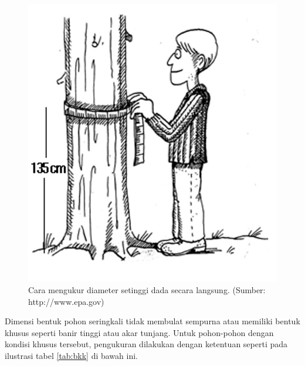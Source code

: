 \documentclass[
]{book}
\begin{document}
\begin{figure}

{\centering \includegraphics[width=1\linewidth]{images/dbhm_ilustration} 

}

\caption{Cara mengukur diameter setinggi dada secara langsung. (Sumber: http://www.epa.gov)}\label{fig:figdbhm}
\end{figure}

Dimensi bentuk pohon seringkali tidak membulat sempurna atau memiliki bentuk khusus seperti banir tinggi atau akar tunjang. Untuk pohon-pohon dengan kondisi khusus tersebut, pengukuran dilakukan dengan ketentuan seperti pada ilustrasi tabel \ref{tab:bkk} di bawah ini.
\end{document}
